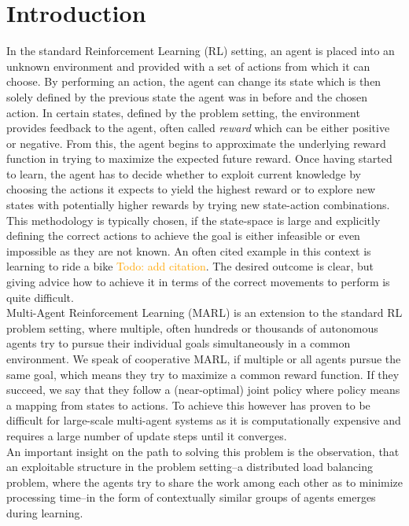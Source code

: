 \documentclass[letterpaper]{article}
\newcommand\todo[1]{\textcolor{orange}{Todo: #1}}
\begin{document}
\section{Introduction} \label{sec:introduction}
In the standard Reinforcement Learning (RL) setting, an agent is placed into an unknown environment and provided with a set of actions from which it can choose. By performing an action, the agent can change its state which is then solely defined by the previous state the agent was in before and the chosen action. In certain states, defined by the problem setting, the environment provides feedback to the agent, often called \textit{reward} which can be either positive or negative. From this, the agent begins to approximate the underlying reward function in trying to maximize the expected future reward. Once having started to learn, the agent has to decide whether to exploit current knowledge by choosing the actions it expects to yield the highest reward or to explore new states with potentially higher rewards by trying new state-action combinations. This methodology is typically chosen, if the state-space is large and explicitly defining the correct actions to achieve the goal is either infeasible or even impossible as they are not known. An often cited example in this context is learning to ride a bike \todo{add citation}. The desired outcome is clear, but giving advice how to achieve it in terms of the correct movements to perform is quite difficult.\\
Multi-Agent Reinforcement Learning (MARL) is an extension to the standard RL problem setting, where multiple, often hundreds or thousands of autonomous agents try to pursue their individual goals simultaneously in a common environment. We speak of cooperative MARL, if multiple or all agents pursue the same goal, which means they try to maximize a common reward function. If they succeed, we say that they follow a (near-optimal) joint policy where policy means a mapping from states to actions. To achieve this however has proven to be difficult for large-scale multi-agent systems as it is computationally expensive and requires a large number of update steps until it converges.\\
An important insight on the path to solving this problem is the observation, that an exploitable structure in the problem setting--a distributed load balancing problem, where the agents try to share the work among each other as to minimize processing time--in the form of contextually similar groups of agents emerges during learning.
\end{document}
